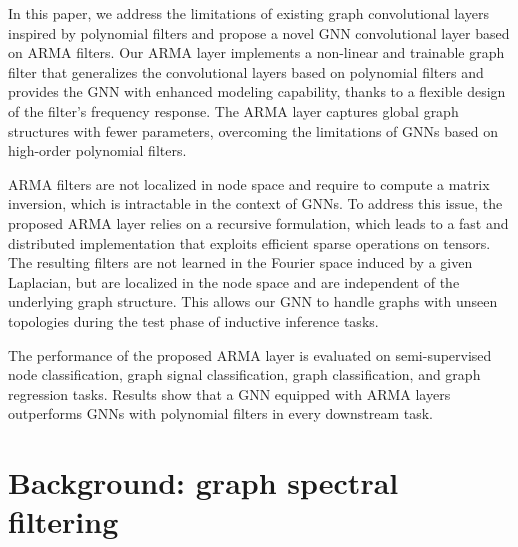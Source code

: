 \documentclass{article}
\begin{document}
In this paper, we address the limitations of existing graph convolutional layers inspired by polynomial filters and propose a novel GNN convolutional layer based on ARMA filters.
Our ARMA layer implements a non-linear and trainable graph filter that generalizes the convolutional layers based on polynomial filters and provides the GNN with enhanced modeling capability, thanks to a flexible design of the filter's frequency response.
The ARMA layer captures global graph structures with fewer parameters, overcoming the limitations of GNNs based on high-order polynomial filters.

ARMA filters are not localized in node space and require to compute a matrix inversion, which is intractable in the context of GNNs.
To address this issue, the proposed ARMA layer relies on a recursive formulation, which leads to a fast and distributed implementation that exploits efficient sparse operations on tensors.
The resulting filters are not learned in the Fourier space induced by a given Laplacian, but are localized in the node space and are independent of the underlying graph structure.
This allows our GNN to handle graphs with unseen topologies during the test phase of inductive inference tasks.

The performance of the proposed ARMA layer is evaluated on semi-supervised node classification, graph signal classification, graph classification, and graph regression tasks. 
Results show that a GNN equipped with ARMA layers outperforms GNNs with polynomial filters in every downstream task.

\section{Background: graph spectral filtering}
\label{sec:spectral_filter}
\end{document}

